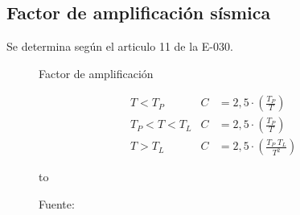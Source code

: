 \documentclass[12pt]{article}
\begin{document}
\subsection{Factor de amplificación sísmica}
Se determina según el articulo 11 de la E-030.
\newpage
\setlength{\jot}{0.5cm}%
\begin{figure}[h!]
    \centering
    \begin{minipage}{0.5\textwidth}
    \vspace{-4cm}
    \caption{Factor de amplificación}
        \begin{align*}
        &T< T_{P}         &   C&=2,5\cdot\left ( \frac{T_{P}}{T} \right )\\
        &T_{P}< T< T_{L}  &   C&=2,5\cdot\left ( \frac{T_{P}}{T} \right )\\
        &T> T_{L}         &   C&=2,5\cdot\left ( \frac{T_{P}\;T_{L}}{T^{2}} \right )
        \end{align*}
    \end{minipage}
    \begin{minipage}{0.4\textwidth}
    \vspace{-3cm}
        \centering
        \vbox to \ht{}
    \end{minipage}
    \vspace{-3.4cm}
    \caption*{\small Fuente: \it \cite{comen}}
  \label{fac}
\end{figure}
\vspace{-0.8cm}
\end{document}
